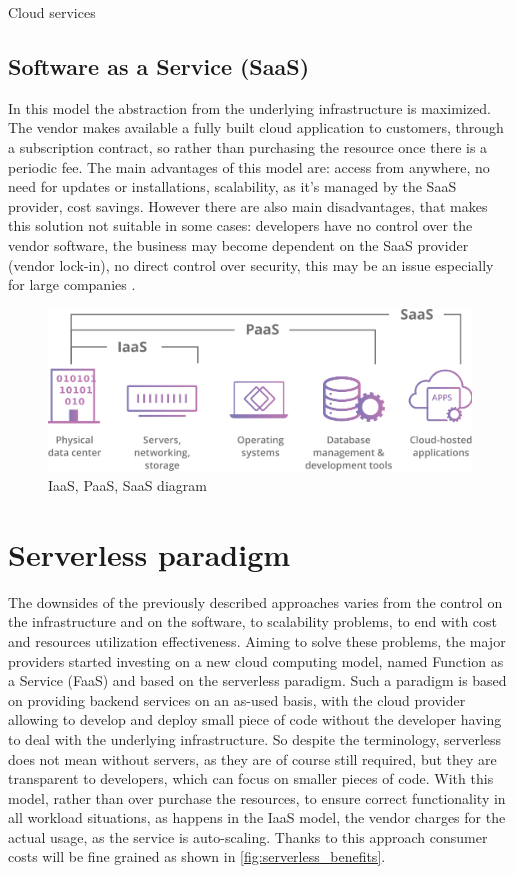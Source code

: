 \begin{chapter}{Cloud services}
    \subsection{Software as a Service (SaaS)}
    In this model the abstraction from the underlying infrastructure is maximized.
    The vendor makes available a fully built cloud application to customers, through
    a subscription contract, so rather than purchasing the resource once there is
    a periodic fee. The main advantages of this model are: access from anywhere,
    no need for updates or installations, scalability, as it's managed by the SaaS
    provider, cost savings.
    However there are also main disadvantages, that makes this solution not suitable
    in some cases: developers have no control over the vendor software, the business
    may become dependent on the SaaS provider (vendor lock-in), no direct control
    over security, this may be an issue especially for large companies \cite{saas}.

    \begin{figure}
        \centering
        \includegraphics[width=\linewidth]{source/images/saas-paas-iaas-diagram.png}
        \caption{IaaS, PaaS, SaaS diagram}
        \label{fig:cloud_computing_architectures}
    \end{figure}

    \section{Serverless paradigm}
    The downsides of the previously described approaches varies from the control on the
    infrastructure and on the software, to scalability problems, to end with cost
    and resources utilization effectiveness.
    Aiming to solve these problems, the major providers started investing on a new
    cloud computing model, named Function as a Service (FaaS) and based on the
    serverless paradigm.
    Such a paradigm is based on providing backend services on an as-used basis, with
    the cloud provider allowing to develop and deploy small piece of code without
    the developer having to deal with the underlying infrastructure.
    So despite the terminology, serverless does not mean without servers, as they are
    of course still required, but they are transparent to developers, which can focus
    on smaller pieces of code.
    With this model, rather than over purchase the resources, to ensure correct
    functionality in all workload situations, as happens in the IaaS model, the vendor
    charges for the actual usage, as the service is auto-scaling. Thanks to this approach
    consumer costs will be fine grained as shown in \ref{fig:serverless_benefits}.


\end{chapter}
